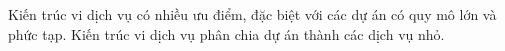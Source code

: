 Kiến trúc vi dịch vụ có nhiều ưu điểm, đặc biệt với các dự án có quy mô lớn và phức tạp.
Kiến trúc vi dịch vụ phân chia dự án thành các dịch vụ nhỏ.














